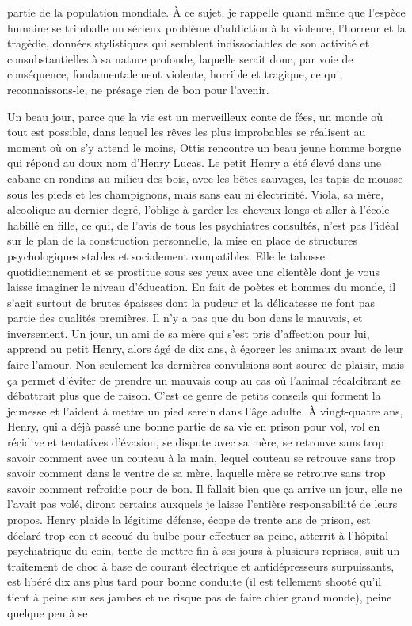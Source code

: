 partie de la population mondiale. À ce sujet, je rappelle quand même que l’espèce humaine se trimballe un sérieux problème d’addiction à la violence, l’horreur et la tragédie, données stylistiques qui semblent indissociables de son activité et consubstantielles à sa nature profonde, laquelle serait donc, par voie de conséquence, fondamentalement violente, horrible et tragique, ce qui, reconnaissons-le, ne présage rien de bon pour l’avenir.

%
Un beau jour, parce que la vie est un merveilleux conte de fées, un monde où tout est possible, dans lequel les rêves les plus improbables se réalisent au moment où on s’y attend le moins, Ottis rencontre un beau jeune homme borgne qui répond au doux nom d’Henry Lucas. Le petit Henry a été élevé dans une cabane en rondins au milieu des bois, avec les bêtes sauvages, les tapis de mousse sous les pieds et les champignons, mais sans eau ni électricité. Viola, sa mère, alcoolique au dernier degré, l’oblige à garder les cheveux longs et aller à l’école habillé en fille, ce qui, de l’avis de tous les psychiatres consultés, n’est pas l’idéal sur le plan de la construction personnelle, la mise en place de structures psychologiques stables et socialement compatibles. Elle le tabasse quotidiennement et se prostitue sous ses yeux avec une clientèle dont je vous laisse imaginer le niveau d’éducation. En fait de poètes et hommes du monde, il s’agit surtout de brutes épaisses dont la pudeur et la délicatesse ne font pas partie des qualités premières. Il n’y a pas que du bon dans le mauvais, et inversement. Un jour, un ami de sa mère qui s’est pris d’affection pour lui, apprend au petit Henry, alors âgé de dix ans, à égorger les animaux avant de leur faire l’amour. Non seulement les dernières convulsions sont source de plaisir, mais ça permet d’éviter de prendre un mauvais coup au cas où l’animal récalcitrant se débattrait plus que de raison. C’est ce genre de petits conseils qui forment la jeunesse et l’aident à mettre un pied serein dans l’âge adulte. À vingt-quatre ans, Henry, qui a déjà passé une bonne partie de sa vie en prison pour vol, vol en récidive et tentatives d’évasion, se dispute avec sa mère, se retrouve sans trop savoir comment avec un couteau à la main, lequel couteau se retrouve sans trop savoir comment dans le ventre de sa mère, laquelle mère se retrouve sans trop savoir comment refroidie pour de bon. Il fallait bien que ça arrive un jour, elle ne l’avait pas volé, diront certains auxquels je laisse l’entière responsabilité de leurs propos. Henry plaide la légitime défense, écope de trente ans de prison, est déclaré trop con et secoué du bulbe pour effectuer sa peine, atterrit à l’hôpital psychiatrique du coin, tente de mettre fin à ses jours à plusieurs reprises, suit un traitement de choc à base de courant électrique et antidépresseurs surpuissants, est libéré dix ans plus tard pour bonne conduite (il est tellement shooté qu’il tient à peine sur ses jambes et ne risque pas de faire chier grand monde), peine quelque peu à se 